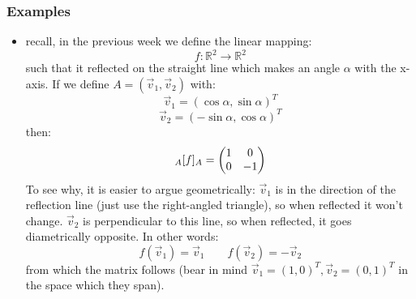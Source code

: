 \documentclass{exam}
\begin{document}
\subsubsection{Examples}
\begin{itemize}
\item recall, in the previous week we define the linear mapping:
\[
f : \mathbb{R}^2 \to \mathbb{R}^2
\]
such that it reflected on the straight line which makes an angle $\alpha$ with the x-axis. If we define $A = (\vec{v}_1, \vec{v}_2)$ with:
\[
\vec{v}_1 = (\cos \alpha, \sin \alpha)^T
\]
\[
\vec{v}_2 = (-\sin \alpha, \cos \alpha)^T
\]
then:
\[
\cript{f}{A}{A} = \begin{pmatrix}
1 & 0 \\
0 & -1
\end{pmatrix}
\]
To see why, it is easier to argue geometrically:
$\vec{v}_1$ is in the direction of the reflection line (just use the right-angled triangle), so when reflected it won't change. $\vec{v}_2$ is perpendicular to this line, so when reflected, it goes diametrically opposite. In other words:
\[
f(\vec{v}_1) = \vec{v}_1 \qquad f(\vec{v}_2) = -\vec{v}_2
\]
from which the matrix follows (bear in mind $\vec{v}_1 = (1,0)^T, \vec{v}_2 = (0,1)^T$ in the space which they span).


\end{itemize}
\end{document}
